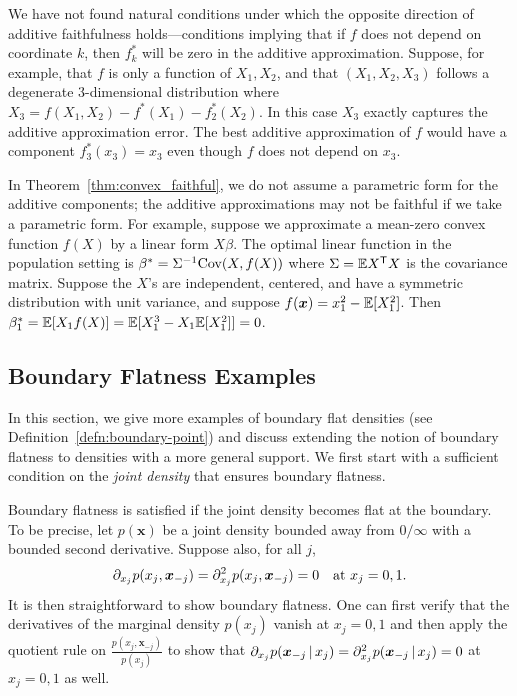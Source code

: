 \begin{remark} 
  We have not found natural conditions under which the opposite
  direction of additive faithfulness holds---conditions implying that if $f$ does not
  depend on coordinate $k$, then $f_k^*$ will be zero in the additive
  approximation.  Suppose, for example, that $f$ is only a
  function of $X_1, X_2$, and that $(X_1, X_2, X_3)$ follows a
  degenerate 3-dimensional distribution where $X_3 = f(X_1, X_2) -
  f^*(X_1) - f^*_2(X_2)$.  In this case $X_3$ exactly captures the
  additive approximation error.  The best additive
  approximation of $f$ would have a component $f^*_3(x_3) = x_3$ even
  though $f$ does not depend on $x_3$.
\end{remark}


\begin{remark}
In Theorem~\ref{thm:convex_faithful}, we do not assume a parametric
form for the additive components; the additive approximations may not
be faithful if we take a parametric form. For example, suppose we
approximate a mean-zero convex function $f(X)$ by a linear form $X
\beta$. The optimal linear function in the population setting is
$\beta^* = \Sigma^{-1} \textrm{Cov}(X, f(X))$ where $\Sigma = {\mathbb E} X^{\mathsf{T}} X$ is the
covariance matrix. Suppose the $X$'s are independent, centered, and have a
symmetric distribution with unit variance, and suppose $f(\mbox{\boldmath $x$})
= x_1^2 - {\mathbb E}[X_1^2]$. Then $\beta^*_1 = {\mathbb E}[ X_1 f(X)] = {\mathbb E}[ X_1^3 -
  X_1 {\mathbb E}[X_1^2]] = 0$.
\end{remark}

\subsection{Boundary Flatness Examples}
\label{sec:boundary_flat}

In this section, we give more examples of boundary flat densities (see
Definition~\ref{defn:boundary-point}) and discuss extending the notion
of boundary flatness to densities with a more general support. We
first start with a sufficient condition on the \emph{joint density}
that ensures boundary flatness.

\begin{example}
\label{ex:joint_density_flat}
Boundary flatness is satisfied if the joint density becomes flat at
the boundary. To be precise, let $p(\mathbf{x})$ be a joint density
bounded away from $0/\infty$ with a bounded second derivative.
Suppose also, for all $j$,
$$
\partial_{x_j} p(x_j,\mbox{\boldmath $x$}_{-j}) =
\partial_{x_j}^2 p(x_j, \mbox{\boldmath $x$}_{-j}) = 0\quad  \textrm{at $x_j = 0, 1$}.
$$ It is then straightforward to show boundary flatness. One can first
verify that the derivatives of the marginal density $p(x_j)$ vanish
at $x_j = 0,1$ and then apply the quotient rule on
$\frac{p(x_j, \mathbf{\scriptstyle x}_{-j})}{p(x_j)}$ to show that $\partial_{x_j}
p(\mbox{\boldmath $x$}_{-j} {\,|\,} x_j) = \partial_{x_j}^2 p(\mbox{\boldmath $x$}_{-j}
{\,|\,} x_j) = 0$ at $x_j = 0,1$ as well.
\end{example}

